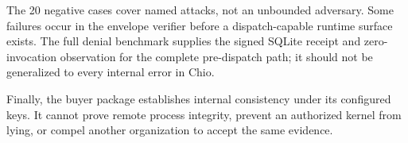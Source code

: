 The 20 negative cases cover named attacks, not an unbounded adversary. Some
failures occur in the envelope verifier before a dispatch-capable runtime
surface exists. The full denial benchmark supplies the signed SQLite receipt
and zero-invocation observation for the complete pre-dispatch path; it should
not be generalized to every internal error in Chio.

Finally, the buyer package establishes internal consistency under its
configured keys. It cannot prove remote process integrity, prevent an
authorized kernel from lying, or compel another organization to accept the
same evidence.
